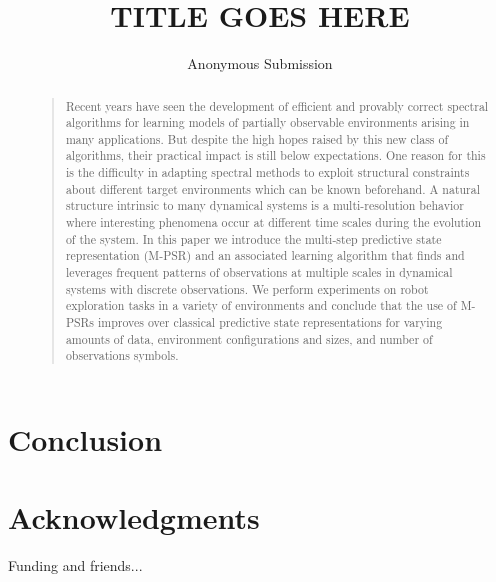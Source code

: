 \documentclass[letterpaper]{article}
\begin{document}
\title{TITLE GOES HERE}
\author{Anonymous Submission}
\maketitle

\begin{abstract}
\begin{quote}
Recent years have seen the development of efficient and provably correct spectral algorithms for learning models of partially observable environments arising in many applications. But despite the high hopes raised by this new class of algorithms, their practical impact is still below expectations. One reason for this is the difficulty in adapting spectral methods to exploit structural constraints about different target environments which can be known beforehand. A natural structure intrinsic to many dynamical systems is a multi-resolution behavior where interesting phenomena occur at different time scales during the evolution of the system. In this paper we introduce the multi-step predictive state representation (M-PSR) and an associated learning algorithm that finds and leverages frequent patterns of observations at multiple scales in dynamical systems with discrete observations. We perform experiments on robot exploration tasks in a variety of environments and conclude that the use of M-PSRs improves over classical predictive state representations for varying amounts of data, environment configurations and sizes, and number of observations symbols.

\end{quote}
\end{abstract}






\section{Conclusion}

\section{Acknowledgments}
Funding and friends...



\end{document}
